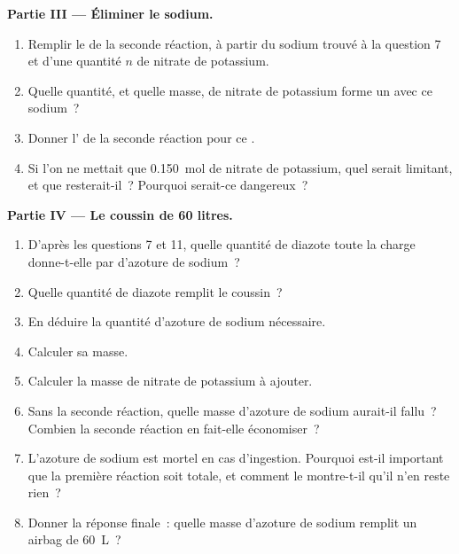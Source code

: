 \begin{problem}
\medskip
\noindent\textbf{Partie III --- Éliminer le sodium.}
\begin{enumerate}[resume]
  \item Remplir le  de la seconde réaction, à partir
        du sodium trouvé à la question 7 et d'une quantité $n$ de nitrate
        de potassium.
  \item Quelle quantité, et quelle masse, de nitrate de potassium forme
        un  avec ce sodium~?
  \item Donner l' de la seconde réaction pour ce .
  \item Si l'on ne mettait que \qty{0.150}{mol} de nitrate de potassium,
        quel  serait limitant, et que resterait-il~? Pourquoi
        serait-ce dangereux~?
\end{enumerate}

\medskip
\noindent\textbf{Partie IV --- Le coussin de 60 litres.}
\begin{enumerate}[resume]
  \item D'après les questions 7 et 11, quelle quantité de diazote toute
        la charge donne-t-elle par  d'azoture de sodium~?
  \item Quelle quantité de diazote remplit le coussin~?
  \item En déduire la quantité d'azoture de sodium nécessaire.
  \item Calculer sa masse.
  \item Calculer la masse de nitrate de potassium à ajouter.
  \item Sans la seconde réaction, quelle masse d'azoture de sodium
        aurait-il fallu~? Combien la seconde réaction en fait-elle
        économiser~?
  \item L'azoture de sodium est mortel en cas d'ingestion. Pourquoi
        est-il important que la première réaction soit totale, et
        comment le  montre-t-il qu'il n'en reste
        rien~?
  \item Donner la réponse finale~: quelle masse d'azoture de sodium
        remplit un airbag de \qty{60}{L}~?
\end{enumerate}
\end{problem}

